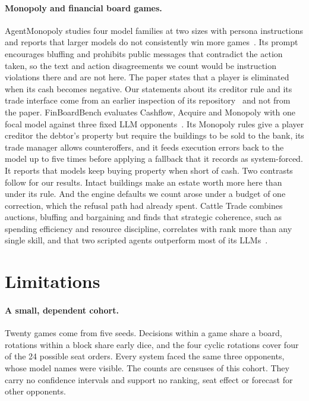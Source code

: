 \paragraph{Monopoly and financial board games.} AgentMonopoly studies four model families at two sizes with persona instructions and reports that larger models do not consistently win more games~\cite{wu2026agentmonopoly}. Its prompt encourages bluffing and prohibits public messages that contradict the action taken, so the text and action disagreements we count would be instruction violations there and are not here. The paper states that a player is eliminated when its cash becomes negative. Our statements about its creditor rule and its trade interface come from an earlier inspection of its repository~\cite{agentmonopoly2026repo} and not from the paper. FinBoardBench evaluates Cashflow, Acquire and Monopoly with one focal model against three fixed LLM opponents~\cite{hu2026finboardbench}. Its Monopoly rules give a player creditor the debtor's property but require the buildings to be sold to the bank, its trade manager allows counteroffers, and it feeds execution errors back to the model up to five times before applying a fallback that it records as system-forced. It reports that models keep buying property when short of cash. Two contrasts follow for our results. Intact buildings make an estate worth more here than under its rule. And the engine defaults we count arose under a budget of one correction, which the refusal path had already spent. Cattle Trade combines auctions, bluffing and bargaining and finds that strategic coherence, such as spending efficiency and resource discipline, correlates with rank more than any single skill, and that two scripted agents outperform most of its LLMs~\cite{muller2026cattletrade}.

\section{Limitations}
\label{sec:limitations}

\paragraph{A small, dependent cohort.} Twenty games come from five seeds. Decisions within a game share a board, rotations within a block share early dice, and the four cyclic rotations cover four of the 24 possible seat orders. Every system faced the same three opponents, whose model names were visible. The counts are censuses of this cohort. They carry no confidence intervals and support no ranking, seat effect or forecast for other opponents.


